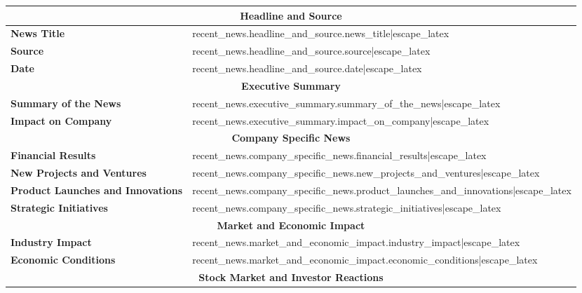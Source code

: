\documentclass{article}
\begin{document}
\begin{table}[H]
    \centering
    \begin{tabularx}{\textwidth}{|m{5cm}|>{\raggedright\arraybackslash}X|}
        \hline
        \multicolumn{2}{|c|}{\textbf{Headline and Source}} \\
        \hline
        \textbf{News Title} & {{ recent_news.headline_and_source.news_title|escape_latex }} \\
        \hline
        \textbf{Source} & {{ recent_news.headline_and_source.source|escape_latex }} \\
        \hline
        \textbf{Date} & {{ recent_news.headline_and_source.date|escape_latex }} \\
        \hline
        \multicolumn{2}{|c|}{\textbf{Executive Summary}} \\
        \hline
        \textbf{Summary of the News} & {{ recent_news.executive_summary.summary_of_the_news|escape_latex }} \\
        \hline
        \textbf{Impact on Company} & {{ recent_news.executive_summary.impact_on_company|escape_latex }} \\
        \hline
        \multicolumn{2}{|c|}{\textbf{Company Specific News}} \\
        \hline
        \textbf{Financial Results} & {{ recent_news.company_specific_news.financial_results|escape_latex }} \\
        \hline
        \textbf{New Projects and Ventures} & {{ recent_news.company_specific_news.new_projects_and_ventures|escape_latex }} \\
        \hline
        \textbf{Product Launches and Innovations} & {{ recent_news.company_specific_news.product_launches_and_innovations|escape_latex }} \\
        \hline
        \textbf{Strategic Initiatives} & {{ recent_news.company_specific_news.strategic_initiatives|escape_latex }} \\
        \hline
        \multicolumn{2}{|c|}{\textbf{Market and Economic Impact}} \\
        \hline
        \textbf{Industry Impact} & {{ recent_news.market_and_economic_impact.industry_impact|escape_latex }} \\
        \hline
        \textbf{Economic Conditions} & {{ recent_news.market_and_economic_impact.economic_conditions|escape_latex }} \\
        \hline
        \multicolumn{2}{|c|}{\textbf{Stock Market and Investor Reactions}} \\

\end{tabularx}
\end{table}
\end{document}
